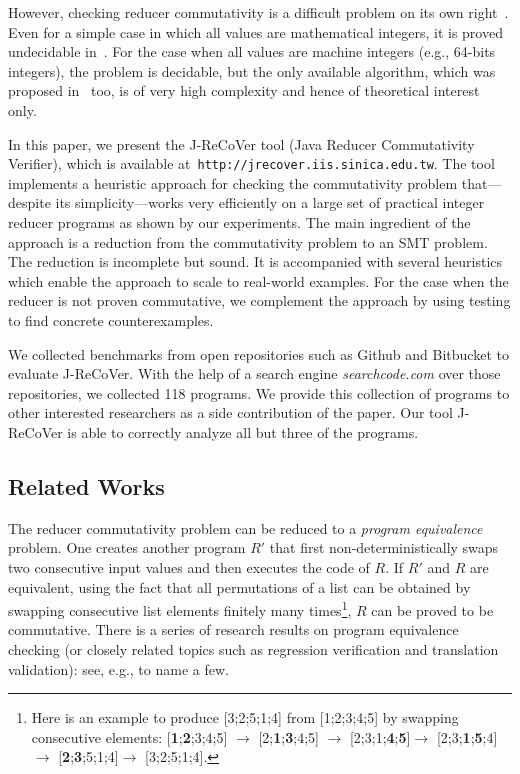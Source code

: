 \documentclass{llncs}
\begin{document}
However, checking reducer commutativity is a difficult problem on its own
right~\cite{ChenHSW15,ChenSW16,ChenLTW17}. Even for a simple case in which all
values are mathematical integers, it is proved undecidable in~\cite{ChenHSW15}.
For the case when all values are machine integers (e.g., 64-bits integers), the
problem is decidable, but the only available algorithm, which was proposed
in~\cite{ChenHSW15} too, is of very high complexity and hence of theoretical
interest only.

In this paper, we present the J-ReCoVer tool (Java Reducer Commutativity
Verifier), which is available at~\verb|http://jrecover.iis.sinica.edu.tw|. The
tool implements a heuristic approach for checking the commutativity problem
that---despite its simplicity---works very efficiently on a large set of
practical integer reducer programs as shown by our experiments. The main
ingredient of the approach is a reduction from the commutativity problem to an
SMT problem. The reduction is incomplete but sound. It is accompanied with
several heuristics which enable the approach to scale to real-world examples.
For the case when the reducer is not proven commutative, we complement the
approach by using testing to find concrete counterexamples.

We collected benchmarks from open repositories such as Github and Bitbucket to
evaluate J-ReCoVer. With the help of a search engine \emph{searchcode.com} over
those repositories, we collected 118 programs. We provide this collection of
programs to other interested researchers as a side contribution of the paper.
Our tool J-ReCoVer is able to correctly analyze all but three of the programs.

\subsection*{Related Works}

The reducer commutativity problem can be reduced to a \emph{program equivalence}
problem. One creates another program $R'$ that first non-deterministically swaps
two consecutive input values and then executes the code of $R$. If $R'$ and $R$
are equivalent, using the fact that all permutations of a list can be obtained
by swapping consecutive list elements finitely many times\footnote{Here is an
example to produce [3;2;5;1;4] from [1;2;3;4;5] by swapping consecutive
elements: [\textbf{1};\textbf{2};3;4;5] $\rightarrow$
[2;\textbf{1};\textbf{3};4;5] $\rightarrow$
[2;3;1;\textbf{4};\textbf{5}]$\rightarrow$
[2;3;\textbf{1};\textbf{5};4]$\rightarrow$
[\textbf{2};\textbf{3};5;1;4]$\rightarrow$ [3;2;5;1;4].}, $R$ can be proved to
be commutative. There is a series of research results on program equivalence
checking (or closely related topics such as regression verification and
translation validation): see, e.g.,
\cite{Pnueli:1998:TV,fedyukovich2015automated,barthe2011relational,KlebanovRuemmerUlbrich2017}
to name a few. 
\end{document}
